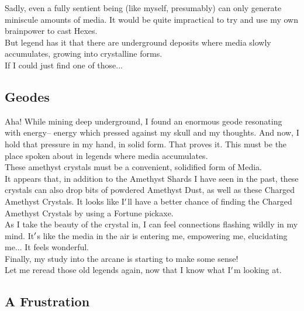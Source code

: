 \documentclass[12pt]{article}
\begin{document}
  
    Sadly, even a fully sentient being (like myself, presumably) can only generate miniscule amounts of media. It would be quite impractical to try and use my own brainpower to cast Hexes.\\But legend has it that there are underground deposits where media slowly accumulates, growing into crystalline forms.\\If I could just find one of those...\\

\newpage

\label{sec:basics/geodes}
\subsection*{Geodes}


  
    Aha! While mining deep underground, I found an enormous geode resonating with energy-- energy which pressed against my skull and my thoughts. And now, I hold that pressure in my hand, in solid form. That proves it. This must be the place spoken about in legends where media accumulates.\\These amethyst crystals must be a convenient, solidified form of Media.\\


  
    It appears that, in addition to the Amethyst Shards I have seen in the past, these crystals can also drop bits of powdered Amethyst Dust, as well as these Charged Amethyst Crystals. It looks like I$\rq$ll have a better chance of finding the Charged Amethyst Crystals by using a Fortune pickaxe.\\


  
    As I take the beauty of the crystal in, I can feel connections flashing wildly in my mind. It$\rq$s like the media in the air is entering me, empowering me, elucidating me... It feels wonderful.\\Finally, my study into the arcane is starting to make some sense!\\Let me reread those old legends again, now that I know what I$\rq$m looking at.\\

\newpage

\label{sec:basics/couldnt_cast}
\subsection*{A Frustration}
\end{document}
